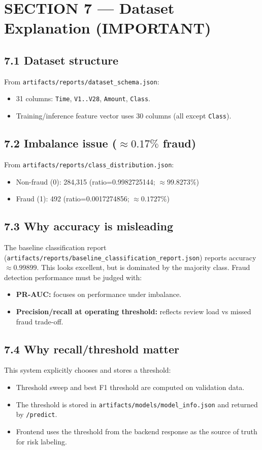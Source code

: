 \documentclass[11pt]{article}
\newcommand{\code}[1]{\texttt{#1}}
\begin{document}
\section*{SECTION 7 — Dataset Explanation (IMPORTANT)}

\subsection*{7.1 Dataset structure}
From \code{artifacts/reports/dataset\_schema.json}:
\begin{itemize}
  \item 31 columns: \code{Time}, \code{V1..V28}, \code{Amount}, \code{Class}.
  \item Training/inference feature vector uses 30 columns (all except \code{Class}).
\end{itemize}

\subsection*{7.2 Imbalance issue (\(\approx 0.17\%\) fraud)}
From \code{artifacts/reports/class\_distribution.json}:
\begin{itemize}
  \item Non-fraud (0): 284{,}315 (ratio=0.9982725144; \(\approx 99.8273\%\))
  \item Fraud (1): 492 (ratio=0.0017274856; \(\approx 0.1727\%\))
\end{itemize}

\subsection*{7.3 Why accuracy is misleading}
The baseline classification report (\code{artifacts/reports/baseline\_classification\_report.json}) reports accuracy \(\approx 0.99899\). This looks excellent, but is dominated by the majority class. Fraud detection performance must be judged with:
\begin{itemize}
  \item \textbf{PR-AUC:} focuses on performance under imbalance.
  \item \textbf{Precision/recall at operating threshold:} reflects review load vs missed fraud trade-off.
\end{itemize}

\subsection*{7.4 Why recall/threshold matter}
This system explicitly chooses and stores a threshold:
\begin{itemize}
  \item Threshold sweep and best F1 threshold are computed on validation data.
  \item The threshold is stored in \code{artifacts/models/model\_info.json} and returned by \code{/predict}.
  \item Frontend uses the threshold from the backend response as the source of truth for risk labeling.
\end{itemize}
\end{document}

